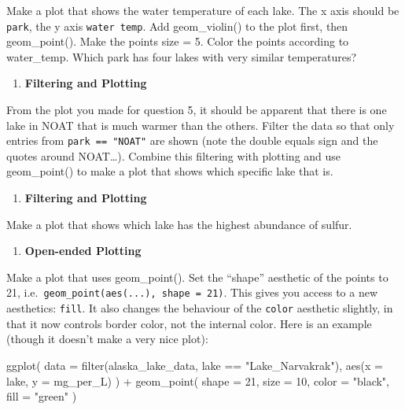 \documentclass[
]{krantz}
\newenvironment{Shaded}{\begin{snugshade}}{\end{snugshade}}
\newcommand{\AttributeTok}[1]{\textcolor[rgb]{0.77,0.63,0.00}{#1}}
\newcommand{\DecValTok}[1]{\textcolor[rgb]{0.00,0.00,0.81}{#1}}
\newcommand{\FunctionTok}[1]{\textcolor[rgb]{0.00,0.00,0.00}{#1}}
\newcommand{\NormalTok}[1]{#1}
\newcommand{\SpecialCharTok}[1]{\textcolor[rgb]{0.00,0.00,0.00}{#1}}
\newcommand{\StringTok}[1]{\textcolor[rgb]{0.31,0.60,0.02}{#1}}
\providecommand{\tightlist}{%
  \setlength{\itemsep}{0pt}\setlength{\parskip}{0pt}}
\begin{document}
Make a plot that shows the water temperature of each lake. The x axis should be \texttt{park}, the y axis \texttt{water\ temp}. Add geom\_violin() to the plot first, then geom\_point(). Make the points size = 5. Color the points according to water\_temp. Which park has four lakes with very similar temperatures?

\begin{enumerate}
\def\labelenumi{\arabic{enumi}.}
\setcounter{enumi}{5}
\tightlist
\item
  \textbf{Filtering and Plotting}
\end{enumerate}

From the plot you made for question 5, it should be apparent that there is one lake in NOAT that is much warmer than the others. Filter the data so that only entries from \texttt{park\ ==\ "NOAT"} are shown (note the double equals sign and the quotes around NOAT\ldots). Combine this filtering with plotting and use geom\_point() to make a plot that shows which specific lake that is.

\begin{enumerate}
\def\labelenumi{\arabic{enumi}.}
\setcounter{enumi}{6}
\tightlist
\item
  \textbf{Filtering and Plotting}
\end{enumerate}

Make a plot that shows which lake has the highest abundance of sulfur.

\begin{enumerate}
\def\labelenumi{\arabic{enumi}.}
\setcounter{enumi}{7}
\tightlist
\item
  \textbf{Open-ended Plotting}
\end{enumerate}

Make a plot that uses geom\_point(). Set the ``shape'' aesthetic of the points to 21, i.e.~\texttt{geom\_point(aes(...),\ shape\ =\ 21)}. This gives you access to a new aesthetics: \texttt{fill}. It also changes the behaviour of the \texttt{color} aesthetic slightly, in that it now controls border color, not the internal color. Here is an example (though it doesn't make a very nice plot):

\begin{Shaded}
\begin{Highlighting}[]
\FunctionTok{ggplot}\NormalTok{(}
  \AttributeTok{data =} \FunctionTok{filter}\NormalTok{(alaska\_lake\_data, lake }\SpecialCharTok{==} \StringTok{"Lake\_Narvakrak"}\NormalTok{),}
  \FunctionTok{aes}\NormalTok{(}\AttributeTok{x =}\NormalTok{ lake, }\AttributeTok{y =}\NormalTok{ mg\_per\_L)}
\NormalTok{) }\SpecialCharTok{+}
  \FunctionTok{geom\_point}\NormalTok{(}
    \AttributeTok{shape =} \DecValTok{21}\NormalTok{, }\AttributeTok{size =} \DecValTok{10}\NormalTok{,}
    \AttributeTok{color =} \StringTok{"black"}\NormalTok{, }\AttributeTok{fill =} \StringTok{"green"}
\NormalTok{  )}
\end{Highlighting}
\end{Shaded}
\end{document}
